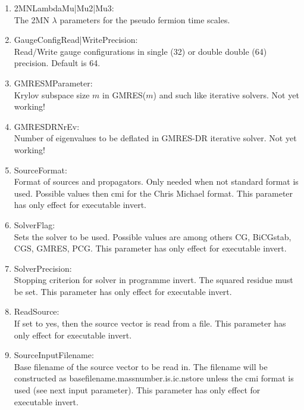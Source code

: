 \begin{enumerate}
\item {\ttfamily 2MNLambdaMu|Mu2|Mu3}:\\
  The 2MN $\lambda$ parameters for the pseudo fermion time scales.

\item {\ttfamily GaugeConfigRead|WritePrecision}:\\
  Read/Write gauge configurations in single (32) or double double (64)
  precision. Default is 64.

\item {\ttfamily GMRESMParameter}:\\
  Krylov subspace size $m$ in GMRES($m$) and such like iterative
  solvers. Not yet working!

\item {\ttfamily GMRESDRNrEv}:\\
  Number of eigenvalues to be deflated in GMRES-DR iterative
  solver. Not yet working!

\item {\ttfamily SourceFormat}:\\
  Format of sources and propagators. Only needed when not standard
  format is used. Possible values then cmi for the Chris Michael
  format. This parameter has only effect for executable {\ttfamily invert}.

\item {\ttfamily SolverFlag}:\\
  Sets the solver to be used. Possible values are among others
  {\ttfamily CG, BiCGstab, CGS, GMRES, PCG}. This parameter has only
  effect for executable {\ttfamily invert}.

\item {\ttfamily SolverPrecision}:\\
  Stopping criterion for solver in programme invert. The squared
  residue must be set. This parameter has only
  effect for executable {\ttfamily invert}.

\item {\ttfamily ReadSource}:\\
  If set to yes, then the source vector is read from a file. This
  parameter has only effect for executable {\ttfamily invert}.

\item {\ttfamily SourceInputFilename}:\\
  Base filename of the source vector to be read in. The filename will
  be constructed as {\ttfamily basefilename.massnumber.is.ic.nstore}
  unless the cmi format is used (see next input parameter). This
  parameter has only effect for executable {\ttfamily invert}.


\end{enumerate}
